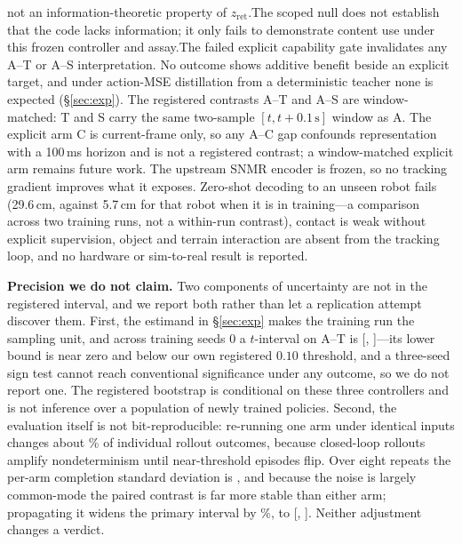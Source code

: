 \documentclass[conference]{IEEEtran}
\newcommand{\ETrainingSeeds}{0}
\begin{document}
not an information-theoretic property of $z_{\mathrm{ret}}$.\else The scoped null does
not establish that the code lacks information; it only fails to demonstrate content
use under this frozen controller and assay.\fi\else The failed explicit capability gate
invalidates any A--T or A--S interpretation.\fi{} No outcome shows additive benefit
beside an explicit target, and under action-MSE distillation from a deterministic teacher
none is expected (\S\ref{sec:exp}).  The registered contrasts A--T and A--S are
window-matched: T and S carry the same two-sample $[t,t{+}0.1\,\mathrm{s}]$ window as A.
The explicit arm C is current-frame only, so any A--C gap confounds representation with
a 100\,ms horizon and is not a registered contrast; a window-matched explicit arm remains
future work.  The upstream SNMR encoder is frozen, so no tracking
gradient improves what it exposes.  Zero-shot decoding to an unseen robot fails
(29.6\,cm, against 5.7\,cm for that robot when it is in training---a comparison across two
training runs, not a within-run contrast), contact is weak without explicit supervision,
object and terrain
interaction are absent from the tracking loop, and no hardware or sim-to-real result is
reported.

\textbf{Precision we do not claim.}  Two components of uncertainty are not in the
registered interval, and we report both rather than let a replication attempt discover
them.  First, the estimand in \S\ref{sec:exp} makes the training run the sampling unit,
and across training seeds \ETrainingSeeds{} a $t$-interval on A--T is
[\ESeedLevelATLow, \ESeedLevelATHigh]---its lower bound is near zero and below our own
registered $0.10$ threshold, and a three-seed sign test cannot reach conventional
significance under any outcome, so we do not report one.  The registered bootstrap is
conditional on these three controllers and is not inference over a population of newly
trained policies.  Second, the evaluation itself is not bit-reproducible: re-running one
arm under identical inputs changes about \EReplicationFlipPercent\% of individual rollout
outcomes, because closed-loop rollouts amplify nondeterminism until near-threshold
episodes flip.  Over eight repeats the per-arm completion standard deviation is
\EReplicationSd{}, and because the noise is largely common-mode the paired contrast is far
more stable than either arm; propagating it widens the primary interval by
\EReplicationWidenPercent\%, to [\EReplicationATLow, \EReplicationATHigh].  Neither
adjustment changes a verdict.
\end{document}
